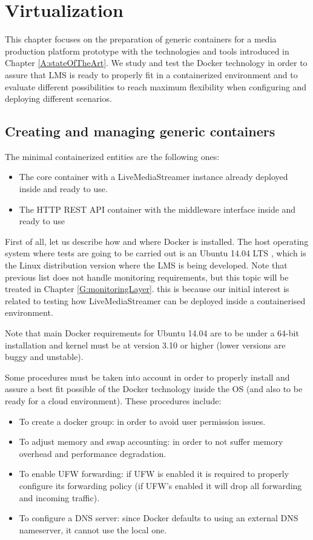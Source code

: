 \chapter{Virtualization}\label{D:virtualization}

This chapter focuses on the preparation of generic containers for a media production platform prototype with the technologies and tools introduced in Chapter \ref{A:stateOfTheArt}. We study and test the Docker technology in order to assure that LMS is ready to properly fit in a containerized environment and to evaluate different possibilities to reach maximum flexibility when configuring and deploying different scenarios.

\section{Creating and managing generic containers}
The minimal containerized entities are the following ones:

\begin{itemize}
\item The core container with a LiveMediaStreamer instance already deployed inside and ready to use.
\item The HTTP REST API container with the middleware interface inside and ready to use
\end{itemize}

First of all, let us describe how and where Docker is installed. The host operating system where tests are going to be carried out is an Ubuntu 14.04 LTS \cite{ubuntu}, which is the Linux distribution version where the LMS is being developed. Note that previous list does not handle monitoring requirements, but this topic will be treated in Chapter \ref{G:monitoringLayer}. this is because our initial interest is related to testing how LiveMediaStreamer can be deployed inside a containerised environment.

Note that main Docker requirements for Ubuntu 14.04 are to be under a 64-bit installation and kernel must be at version 3.10 or higher (lower versions are buggy and unstable). 

Some procedures must be taken into account in order to properly install and assure a best fit possible of the Docker technology inside the OS (and also to be ready for a cloud environment). These procedures include:

\begin{itemize}
\item To create a docker group: in order to avoid user permission issues.
\item To adjust memory and swap accounting: in order to not suffer memory overhead and performance degradation.
\item To enable UFW forwarding: if UFW is enabled it is required to properly configure its forwarding policy (if UFW's enabled it will drop all forwarding and incoming traffic).
\item To configure a DNS server: since Docker defaults to using an external DNS nameserver, it cannot use the local one.
\end{itemize}

